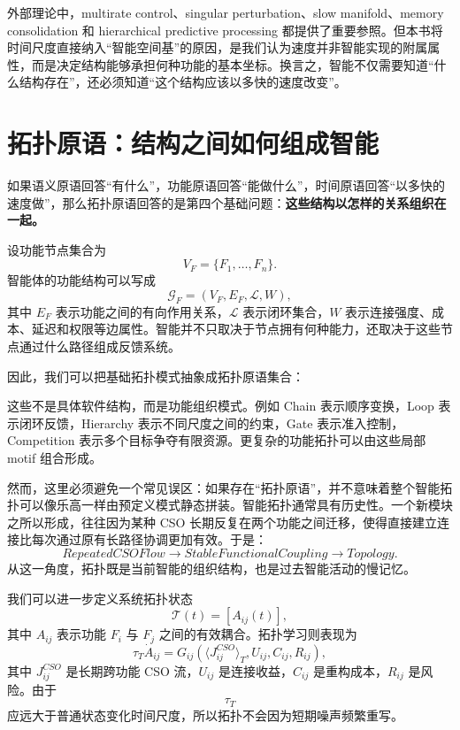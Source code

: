 外部理论中，multirate control、singular perturbation、slow manifold、memory consolidation 和 hierarchical predictive processing 都提供了重要参照。但本书将时间尺度直接纳入“智能空间基”的原因，是我们认为速度并非智能实现的附属属性，而是决定结构能够承担何种功能的基本坐标。换言之，智能不仅需要知道“什么结构存在”，还必须知道“这个结构应该以多快的速度改变”。

\section{拓扑原语：结构之间如何组成智能}

如果语义原语回答“有什么”，功能原语回答“能做什么”，时间原语回答“以多快的速度做”，那么拓扑原语回答的是第四个基础问题：\textbf{这些结构以怎样的关系组织在一起。}

设功能节点集合为
\[
V_F=\{F_1,\ldots,F_n\}.
\]
智能体的功能结构可以写成
\[
\mathcal G_F=(V_F,E_F,\mathcal L,W),
\]
其中 $E_F$ 表示功能之间的有向作用关系，$\mathcal L$ 表示闭环集合，$W$ 表示连接强度、成本、延迟和权限等边属性。智能并不只取决于节点拥有何种能力，还取决于这些节点通过什么路径组成反馈系统。

因此，我们可以把基础拓扑模式抽象成拓扑原语集合：
\begin{statementbox}
\centering
{}
\end{statementbox}
这些不是具体软件结构，而是功能组织模式。例如 Chain 表示顺序变换，Loop 表示闭环反馈，Hierarchy 表示不同尺度之间的约束，Gate 表示准入控制，Competition 表示多个目标争夺有限资源。更复杂的功能拓扑可以由这些局部 motif 组合形成。

然而，这里必须避免一个常见误区：如果存在“拓扑原语”，并不意味着整个智能拓扑可以像乐高一样由预定义模式静态拼装。智能拓扑通常具有历史性。一个新模块之所以形成，往往因为某种 CSO 长期反复在两个功能之间迁移，使得直接建立连接比每次通过原有长路径协调更加有效。于是：
\[
RepeatedCSOFlow
\rightarrow
StableFunctionalCoupling
\rightarrow
Topology.
\]
从这一角度，拓扑既是当前智能的组织结构，也是过去智能活动的慢记忆。

我们可以进一步定义系统拓扑状态
\[
\mathcal T(t)
=
[A_{ij}(t)],
\]
其中 $A_{ij}$ 表示功能 $F_i$ 与 $F_j$ 之间的有效耦合。拓扑学习则表现为
\[
\tau_T\dot A_{ij}
=
G_{ij}
\left(
\langle J^{CSO}_{ij}\rangle_T,
U_{ij},
C_{ij},
R_{ij}
\right),
\]
其中 $J^{CSO}_{ij}$ 是长期跨功能 CSO 流，$U_{ij}$ 是连接收益，$C_{ij}$ 是重构成本，$R_{ij}$ 是风险。由于
\[
\tau_T
\]
应远大于普通状态变化时间尺度，所以拓扑不会因为短期噪声频繁重写。

